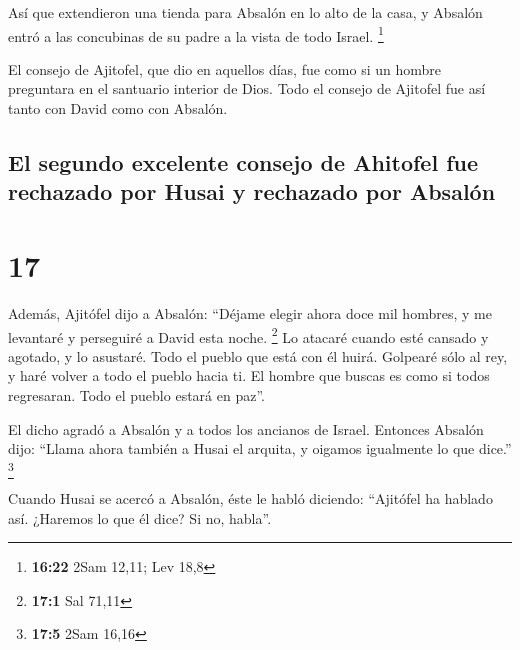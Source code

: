  Así que extendieron una tienda para Absalón en lo alto
de la casa, y Absalón entró a las concubinas de su padre a la vista de
todo Israel. \footnote{\textbf{16:22} 2Sam 12,11; Lev 18,8}

 El consejo de Ajitofel, que dio en aquellos días, fue
como si un hombre preguntara en el santuario interior de Dios. Todo el
consejo de Ajitofel fue así tanto con David como con Absalón.

\hypertarget{el-segundo-excelente-consejo-de-ahitofel-fue-rechazado-por-husai-y-rechazado-por-absaluxf3n}{%
\subsection{El segundo excelente consejo de Ahitofel fue rechazado por
Husai y rechazado por
Absalón}\label{el-segundo-excelente-consejo-de-ahitofel-fue-rechazado-por-husai-y-rechazado-por-absaluxf3n}}

\hypertarget{section-16}{%
\section{17}\label{section-16}}

 Además, Ajitófel dijo a Absalón: ``Déjame elegir ahora
doce mil hombres, y me levantaré y perseguiré a David esta noche.
\footnote{\textbf{17:1} Sal 71,11}  Lo atacaré cuando esté
cansado y agotado, y lo asustaré. Todo el pueblo que está con él huirá.
Golpearé sólo al rey,  y haré volver a todo el pueblo
hacia ti. El hombre que buscas es como si todos regresaran. Todo el
pueblo estará en paz''.

 El dicho agradó a Absalón y a todos los ancianos de
Israel.  Entonces Absalón dijo: ``Llama ahora también a
Husai el arquita, y oigamos igualmente lo que dice.'' \footnote{\textbf{17:5}
  2Sam 16,16}

 Cuando Husai se acercó a Absalón, éste le habló diciendo:
``Ajitófel ha hablado así. ¿Haremos lo que él dice? Si no, habla''.

